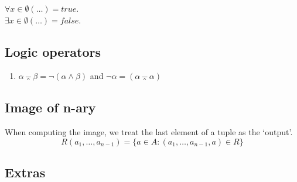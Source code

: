 \documentclass[twocolumn,a4paper]{article}
\newcommand{\image}[1]{
\begin{figure}[ht]
	\centering
	\fbox{\resizebox{1\columnwidth}{!}{\texttt{[image: \#1]}}}
\end{figure}
}
\begin{document}
\(\forall x\in\emptyset(\ldots) = true\). \\
\(\exists x\in\emptyset(\ldots) = false\).

\subsection*{Logic operators}
\begin{enumerate}
	\item $\alpha \barwedge \beta = \neg (\alpha \wedge \beta)$ and $\neg \alpha = (\alpha \barwedge \alpha)$
\end{enumerate}

\subsection*{Image of n-ary}
When computing the image, we treat the last element of a tuple as the `output'.
\begin{equation}
	R(a_1, \ldots, a_{n-1}) = \{a \in A : (a_1, \ldots, a_{n-1}, a) \in R \}
\end{equation}

\newpage
\subsection*{Extras}

\image{2017_1/2017a/uppg3.png}
\image{2017_1/2017a/uppg5.png}
\image{2017_1/2017a/uppg4-no-crop.png}
\image{2017_1/2017a/4-help.png}
\image{misc/2018-2-2-q.png}
\image{misc/2018-2-2-s.png}
\image{misc/vertecies-uppg.png}
\image{misc/vertecies-sol.png}
\image{misc/languages.png}
\image{misc/5-1.png}
\image{misc/5-2.png}
\end{document}
